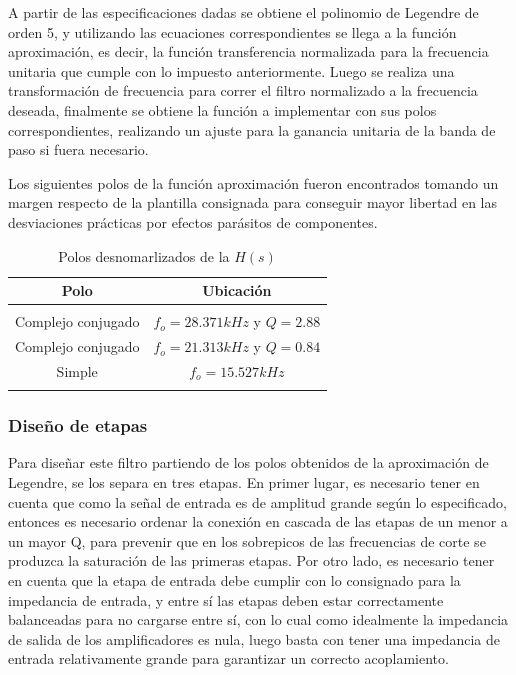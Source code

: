 A partir de las especificaciones dadas se obtiene el polinomio de Legendre de orden 5, y utilizando las ecuaciones correspondientes se llega a la funci\'on aproximaci\'on, es decir, la funci\'on
transferencia normalizada para la frecuencia unitaria que cumple con lo impuesto anteriormente. Luego se realiza una transformaci\'on de frecuencia para correr el filtro normalizado a la frecuencia deseada,
finalmente se obtiene la funci\'on a implementar con sus polos correspondientes, realizando un ajuste para la ganancia unitaria de la banda de paso si fuera necesario.

Los siguientes polos de la funci\'on aproximaci\'on fueron encontrados tomando un margen respecto de la plantilla consignada para conseguir mayor libertad en las desviaciones pr\'acticas por efectos par\'asitos de componentes.

\begin{table}[H]
    \centering
    \begin{tabular}{c | c}
        Polo & Ubicaci\'on \\
        \hline \\
        Complejo conjugado & $f_o = 28.371kHz$ y $Q = 2.88$ \\
        Complejo conjugado & $f_o = 21.313kHz$ y $Q = 0.84$\\
        Simple & $f_o = 15.527kHz$\\
        \\ \hline
    \end{tabular}
    \caption{Polos desnomarlizados de la $H(s)$}
\end{table}

\subsubsection{Dise\~no de etapas}
Para dise\~nar este filtro partiendo de los polos obtenidos de la aproximaci\'on de Legendre, se los separa en tres etapas. En primer lugar, es necesario tener en cuenta que como la se\~nal de entrada
es de amplitud grande seg\'un lo especificado, entonces es necesario ordenar la conexi\'on en cascada de las etapas de un menor a un mayor Q, para prevenir que en los sobrepicos de las frecuencias de corte
se produzca la saturaci\'on de las primeras etapas. Por otro lado, es necesario tener en cuenta que la etapa de entrada debe cumplir con lo consignado para la impedancia de entrada,
y entre s\'i las etapas deben estar correctamente balanceadas para no cargarse entre s\'i, con lo cual como idealmente la impedancia de salida de los amplificadores es nula, luego basta con tener una impedancia de entrada
relativamente grande para garantizar un correcto acoplamiento.

